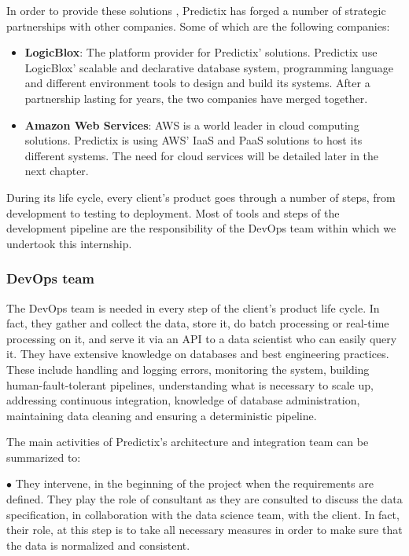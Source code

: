 \noindent In order to provide these solutions , Predictix has forged a number of
strategic partnerships with other companies. Some of which are the following
companies:

\begin{itemize}
  \item{\textbf{LogicBlox}: The platform provider for Predictix' solutions. Predictix use
LogicBlox' scalable and declarative database system, programming language and
different environment tools to design and build  its systems. After a
partnership lasting for years, the two companies have merged together.\cite{logicblox}}

\item{\textbf{Amazon Web Services}: AWS is a world leader in cloud computing
solutions. Predictix is using AWS' IaaS and PaaS solutions to host its different
systems. The need for cloud services will be detailed later in the next chapter.}
\end{itemize}

During its life cycle, every client's product goes through a number of steps,
from development to testing to deployment. Most of tools and steps of the
development pipeline are the responsibility of the DevOps team within which we
undertook this internship.

\subsubsection{DevOps team}

The DevOps team is needed in every step of the client's product life cycle. In 
fact, they gather and collect the data, store it, do batch processing or
real-time processing on it, and serve it via an API to a data scientist who can
easily query it. They have extensive knowledge on databases and best
engineering practices. These include handling and logging errors, monitoring
the system, building human-fault-tolerant pipelines, understanding what is
necessary to scale up, addressing continuous integration, knowledge of database
administration, maintaining data cleaning and ensuring a deterministic
pipeline.

The main activities of Predictix's architecture and integration team can be
summarized to:

$\bullet$ They intervene, in the beginning of the project when the requirements are
defined. They play the role of consultant as they are consulted to discuss the
data specification, in collaboration with the data science team, with the
client. In fact, their role, at this step is to take all necessary measures in
order to make sure that the data is normalized and consistent.


